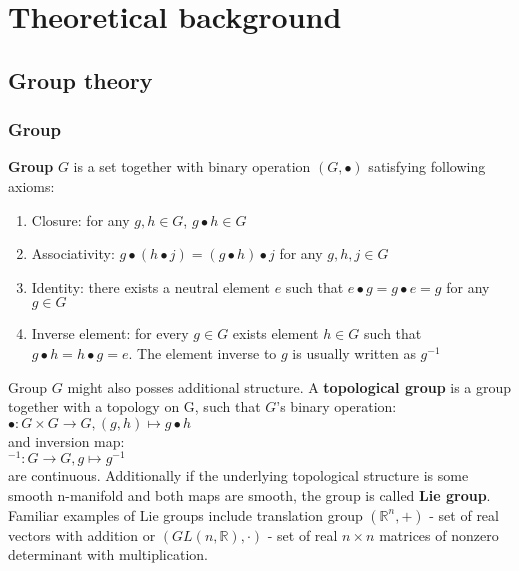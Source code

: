 \chapter{Theoretical background}

\section{Group theory}
    \subsection{Group}
    \textbf{Group} $G$ is a set together with binary operation $\left(G, \bullet \right)$ satisfying
    following axioms:
    \begin{enumerate}
        \item Closure: for any $g, h \in G$, $g \bullet h \in G$
        \item Associativity:  $g\bullet \left(h \bullet j \right) = 
                    \left(g \bullet h \right) \bullet j$ for any $g,h,j \in G$
        \item Identity: there exists a neutral element $e$ such that 
                $e \bullet g = g \bullet e = g$ for any $g \in G$
        \item Inverse element: for every $g \in G$ exists element $h \in G$ such that
                $g \bullet h = h\bullet g = e$. The element inverse to $g$ is usually
                written as $g^{-1}$
    \end{enumerate}
    \par Group $G$ might also posses additional structure. A \textbf{topological group} 
        is a group together with a topology on G, such that $G$'s binary operation:\\
        \hspace*{0.5cm} $\bullet: G \times G \to G, \left(g,h \right) \mapsto g\bullet h$ \\
        and inversion map: \\
        \hspace*{0.5cm} ${}^{-1}: G \to G, g \mapsto g^{-1}$ \\
        are continuous. Additionally if the underlying topological structure
        is some smooth n-manifold and both maps are smooth, the group is called
        \textbf{Lie group}. Familiar examples of Lie groups include translation group
        $\left( \mathbb{R}^n, + \right)$ - set of real vectors with addition or
        $\left(GL(n,\mathbb{R}), \cdot \right)$ - set of real $n \times n$ matrices of nonzero determinant
        with multiplication.

